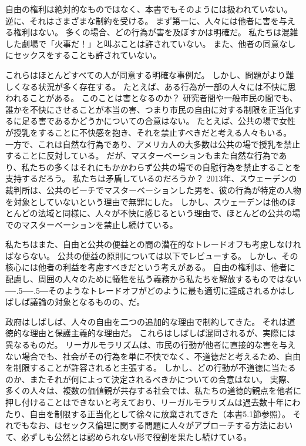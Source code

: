 \documentclass[paper=a4,book,openany]{jlreq}
\def\DDASH{―\kern-.5\zw―\kern-.5\zw―} %
\begin{document}
自由の権利は絶対的なものではなく、本書でもそのようには扱われていない。
逆に、それはさまざまな制約を受ける。
まず第一に、人々には他者に害を与える権利はない。
多くの場合、どの行為が害を及ぼすかは明確だ。
私たちは混雑した劇場で「火事だ！」と叫ぶことは許されていない。
また、他者の同意なしにセックスをすることも許されていない。

これらはほとんどすべての人が同意する明確な事例だ。
しかし、問題がより難しくなる状況が多く存在する。
たとえば、ある行為が一部の人々には不快に思われることがある。
このことは害となるのか？ 研究者間や一般市民の間でも、誰かを不快にさせることが本当の害、つまり市民の自由に対する制限を正当化するに足る害であるかどうかについての合意はない。
たとえば、公共の場で女性が授乳をすることに不快感を抱き、それを禁止すべきだと考える人々もいる。
一方で、これは自然な行為であり、アメリカ人の大多数は公共の場で授乳を禁止することに反対している\citep{cdc08:_public_opinion_breas}。
だが、マスターベーションもまた自然な行為であり、私たちの多くはそれにもかかわらず公共の場での自慰行為を禁止することを支持するだろう。
私たちは矛盾しているのだろうか？ 2013年、スウェーデンの裁判所は、公共のビーチでマスターベーションした男を、彼の行為が特定の人物を対象としていないという理由で無罪にした\citep{ederyd13:_you_cant_just_walk_aroun}。
しかし、スウェーデンは他のほとんどの法域と同様に、人々が不快に感じるという理由で、ほとんどの公共の場でのマスターベーションを禁止し続けている。

私たちはまた、自由と公共の便益との間の潜在的なトレードオフも考慮しなければならない。
公共の便益の原則については以下でレビューする。
しかし、その核心には他者の利益を考慮すべきだという考えがある。
自由の権利は、他者に配慮し、周囲の人々のために犠牲を払う義務から私たちを解放するものではない{\DDASH}そのようなトレードオフがどのように最も適切に達成されるかはしばしば議論の対象となるものの、だ。

政府はしばしば、人々の自由を二つの追加的な理由で制約してきた。
それは道徳的な理由と保護主義的な理由だ。
これらはしばしば混同されるが、実際には異なるものだ。
リーガルモラリズムは、市民の行動が他者に直接的な害を与えない場合でも、社会がその行為を単に不快でなく、不道徳だと考えるため、自由を制限することが許容されると主張する。
しかし、どの行動が不道徳に当たるのか、またそれが何によって決定されるべきかについての合意はない。
実際、多くの人々は、複数の価値観が共存する社会では、私たちの道徳的観点を他者に押し付けることはできないと考えており、リーガルモラリズムは過去数十年にわたり、自由を制限する正当化として徐々に放棄されてきた（本書5.1節参照）。
それでもなお、はセックス倫理に関する問題に人々がアプローチする方法において、必ずしも公然とは認められない形で役割を果たし続けている。
\end{document}
